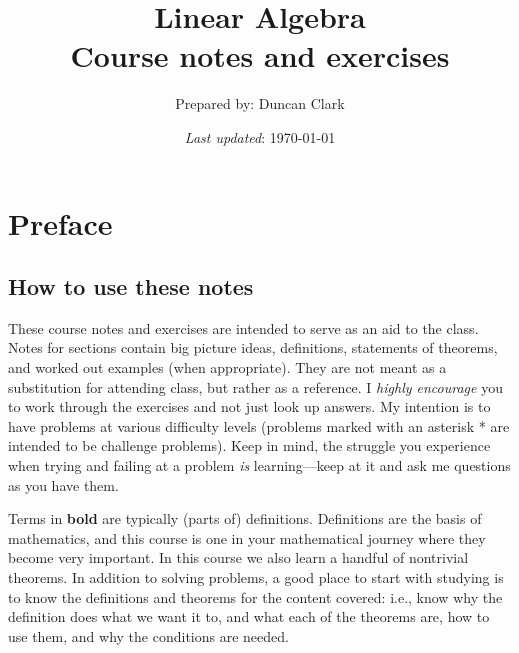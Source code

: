 \documentclass[12pt]{article}
\numberwithin{equation}{subsection}
\numberwithin{figure}{subsection}
\theoremstyle{note}
\begin{document}
\title{ \textbf{Linear Algebra \\ Course notes and exercises}}
\author{\small Prepared by: Duncan Clark}
\date{\small 
\textit{Last updated}: \today}
\maketitle 


\tableofcontents 


\newpage

\section{Preface}


\subsection{How to use these notes} These course notes and exercises are intended to serve as an aid to the class. Notes for sections contain big picture ideas, definitions, statements of theorems, and worked out examples (when appropriate). They are not meant as a substitution for attending class, but rather as a reference. I \textit{highly encourage} you to work through the exercises and not just look up answers. My intention is to have problems at various difficulty levels (problems marked with an asterisk * are intended to be challenge problems). Keep in mind, the struggle you experience when trying and failing at a problem \textit{is} learning---keep at it and ask me questions as you have them. 

Terms in \textbf{bold} are typically (parts of) definitions. Definitions are the basis of mathematics, and this course is one in your mathematical journey where they become very important. In this course we also learn a handful of nontrivial theorems. In addition to solving problems, a good place to start with studying is to know the definitions and theorems for the content covered: i.e., know why the definition does what we want it to, and  what each of the theorems are, how to use them, and why the conditions are needed.
\end{document}
